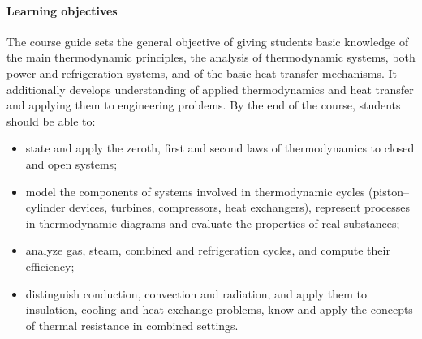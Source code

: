 \documentclass[11pt]{article}
\begin{document}
\paragraph{Learning objectives}

The course guide sets the general objective of giving students basic knowledge of the main thermodynamic principles, the analysis of thermodynamic systems, both power and refrigeration systems, and of the basic heat transfer mechanisms. 
It additionally develops understanding of applied thermodynamics and heat transfer and applying them to engineering problems.
By the end of the course, students should be able to:
\begin{itemize}
  \item state and apply the zeroth, first and second laws of thermodynamics to closed and   open systems;
  \item model the components of systems involved in thermodynamic cycles (piston--cylinder devices, turbines, compressors, heat exchangers), represent processes in thermodynamic diagrams and evaluate the properties of real substances;
  \item analyze gas, steam, combined and refrigeration cycles, and compute their efficiency;
  \item distinguish conduction, convection and radiation, and apply them to insulation, cooling and heat-exchange problems, know and apply the concepts of thermal resistance in combined settings.
\end{itemize}
\end{document}
